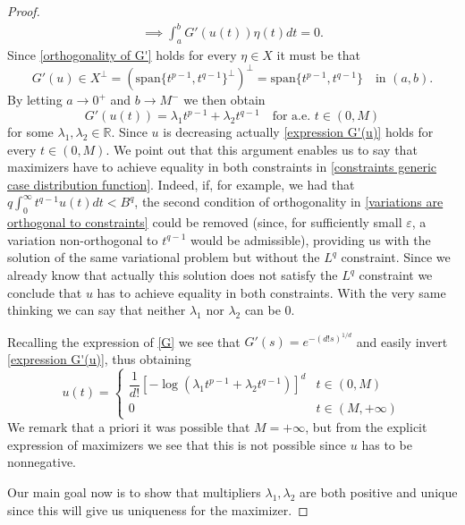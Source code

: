 \documentclass[corpo=11pt, stile=classica, tipotesi=custom,
greek, evenboxes, english]{toptesi}
\numberwithin{equation}{chapter}
\newcommand{\R}{\mathbb{R}} %
\begin{document}
\begin{proof}
{\begin{gather}
	\implies \int_a^b G'(u(t)) \eta(t) dt = 0. \label{orthogonality of G'}
\end{gather}}
Since \eqref{orthogonality of G'} holds for every $\eta \in X$ it must be that 
\begin{equation*}
	G'(u) \in X^{\perp} = \left(\mathrm{span}\{t^{p-1},t^{q-1}\}^{\perp}\right)^{\perp} = \mathrm{span}\{t^{p-1},t^{q-1}\} \quad \text{in } (a,b).
\end{equation*}
By letting $a \rightarrow 0^+$ and $b \rightarrow M^-$ we then obtain
\begin{equation}\label{expression G'(u)}
	G'(u(t)) = \lambda_1 t^{p-1} + \lambda_2 t^{q-1} \quad \text{for a.e. } t \in (0,M)
\end{equation}
for some $\lambda_1,\lambda_2 \in \R$. Since $u$ is decreasing actually \eqref{expression G'(u)} holds for every $t \in (0,M)$. {\color{red} We point out that this argument enables us to say that maximizers have to achieve equality in both constraints in \eqref{constraints generic case distribution function}. Indeed, if, for example, we had that $q \int_0^{\infty} t^{q-1}u(t)dt < B^q$, the second condition of orthogonality in \eqref{variations are orthogonal to constraints} could be removed (since, for sufficiently small $\varepsilon$, a variation non-orthogonal to $t^{q-1}$ would be admissible), providing us with the solution of the same variational problem but without the $L^q$ constraint. Since we already know that actually this solution does not satisfy the $L^q$ constraint we conclude that $u$ has to achieve equality in both constraints. With the very same thinking we can say that neither $\lambda_1$ nor $\lambda_2$ can be 0.}


 Recalling the expression of \eqref{G} we see that $G'(s) = e^{-(d!s)^{1/d}}$ and {\color{blue} easily invert \eqref{expression G'(u)}}, thus obtaining
\begin{equation}\label{expression u}
	u(t) = \begin{cases}
		\dfrac{1}{d!} \left[-\log\left(\lambda_1 t^{p-1} + \lambda_2 t^{q-1}\right) \right]^d & t \in (0,M)\\
		0 & t \in (M,+\infty)
	\end{cases}
\end{equation}
We remark that a priori it was possible that $M=+\infty$, but from the explicit expression of maximizers we see that this is not possible since $u$ has to be nonnegative.

Our main goal now is to show that multipliers $\lambda_1, \lambda_2$ are both positive and unique since this will give us uniqueness for the maximizer.


\end{proof}
\end{document}
